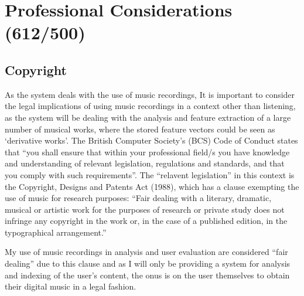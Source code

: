 \section{Professional Considerations (612/500)}

\subsection{Copyright}
As the system deals with the use of music recordings, 
It is important to consider the legal implications of using music recordings in a context other than listening, as the system will be dealing with the analysis and feature extraction of a large number of musical works, where the stored feature vectors could be seen as `derivative works'. The British Computer Society's (BCS) Code of Conduct states that ``you shall ensure that within your professional field/s you have knowledge and understanding of relevant legislation, regulations and standards, and that you comply with such requirements''. The ``relavent legislation'' in this context is the Copyright, Designs and Patents Act (1988), which has a clause exempting the use of music for research purposes: ``Fair dealing with a literary, dramatic, musical or artistic work for the purposes of research or private study does not infringe any copyright in the work or, in the case of a published edition, in the typographical arrangement.''

My use of music recordings in analysis and user evaluation are considered ``fair dealing'' due to this clause and as I
will only be providing a system for analysis and indexing of the user's content,
the onus is on the user themselves to obtain their digital music in a legal fashion.

